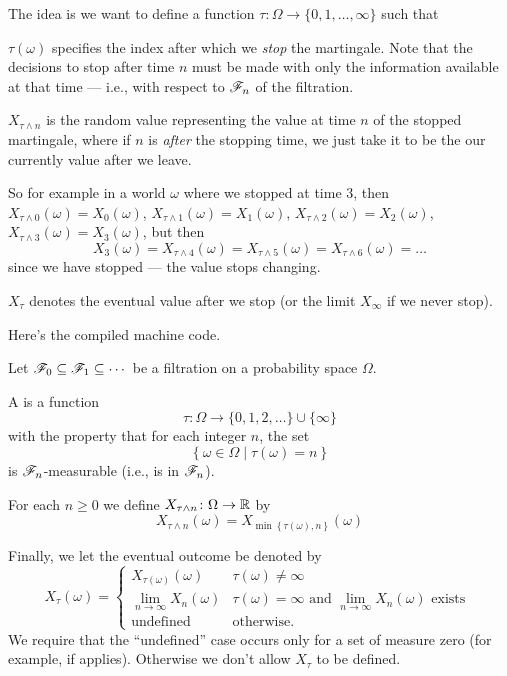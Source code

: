 The idea is we want to define a function
$\tau \colon \Omega \to \{0, 1, \dots, \infty\}$ such that
\begin{itemize}
	\ii $\tau(\omega)$ specifies the index
	after which we \emph{stop} the martingale.
	Note that the decisions to stop after time $n$
	must be made with only the information available at that time ---
	i.e., with respect to $\mathscr F_n$ of the filtration.

	\ii $X_{\tau \wedge n}$ is the random value representing the
	value at time $n$ of the stopped martingale,
	where if $n$ is \emph{after} the stopping time,
	we just take it to be the our currently value after we leave.

	So for example in a world $\omega$ where we stopped at time $3$, then
	$X_{\tau \wedge 0}(\omega) = X_0(\omega)$,
	$X_{\tau \wedge 1}(\omega) = X_1(\omega)$,
	$X_{\tau \wedge 2}(\omega) = X_2(\omega)$,
	$X_{\tau \wedge 3}(\omega) = X_3(\omega)$, but then
	\[ X_3(\omega)
		= X_{\tau \wedge 4}(\omega)
		= X_{\tau \wedge 5}(\omega)
		= X_{\tau \wedge 6}(\omega)
		= \dots
	\]
	since we have stopped --- the value stops changing.

	\ii $X_{\tau}$ denotes the eventual value after we stop
	(or the limit $X_\infty$ if we never stop).
\end{itemize}

Here's the compiled machine code.
\begin{definition}
	Let $\mathscr F_0 \subseteq \mathscr F_1 \subseteq \cdots$ be a filtration
	on a probability space $\Omega$.
	\begin{itemize}
		\ii A  is a function
		\[ \tau \colon \Omega \to \{0, 1, 2, \dots\} \cup \{\infty\} \]
		with the property that for each integer $n$, the set
		\[ \left\{ \omega \in \Omega \mid \tau(\omega) = n \right\} \]
		is $\mathscr F_n$-measurable (i.e., is in $\mathscr F_n$).

		\ii For each $n \ge 0$ we define
		$X_{\tau \wedge n} \colon \Omega \to \mathbb R$ by
		\[ X_{\tau \wedge n}(\omega)
		= X_{\min \left\{ \tau(\omega), n \right\}}(\omega) \]

		\ii Finally, we let the eventual outcome be denoted by
		\[ X_\tau(\omega)
			= \begin{cases}
				X_{\tau(\omega)}(\omega) & \tau(\omega) \neq \infty \\
				\lim_{n \to \infty} X_n(\omega) & \tau(\omega) = \infty
				\text{ and } \lim_{n \to \infty} X_n(\omega) \text{ exists } \\
				\text{undefined} & \text{otherwise}.
			\end{cases}
		\]
		We require that the ``undefined'' case occurs
		only for a set of measure zero
		(for example, if  applies).
		Otherwise we don't allow $X_\tau$ to be defined.
	\end{itemize}
\end{definition}


